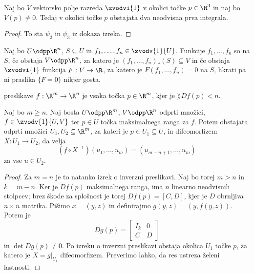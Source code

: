 \begin{posledica}
  Naj bo $V$ vektorsko polje razreda $\zvodvi{1}$ v okolici točke $p \in \R^3$
  in naj bo $V(p) \ne 0$.
  Tedaj v okolici točke $p$ obstajata dva neodvisna prva integrala.
\end{posledica}

\begin{proof}
  To sta $\psi_2$ in $\psi_3$ iz dokaza izreka.
\end{proof}



\begin{definicija}
  Naj bo $U \odpp \R^n$, $S \subseteq U$ in $f_1, \ldots, f_n \in \zvodv{1}{U}$.
  Funkcije $f_1, \ldots, f_n$ so  na $S$, če obstaja
  $V\odpp\R^n$, za katero je $(f_1, \ldots, f_n)_*(S) \subseteq V$ in če obstaja
  $\zvodvi{1}$ funkcija $F: V \to \R$, za katero je $F(f_1, \ldots, f_n) = 0$ na
  $S$, hkrati pa ni praslika $\{F = 0\}$ nikjer gosta.
\end{definicija}


\begin{definicija}
   preslikave $f: \R^m \to \R^n$ je vsaka točka $p \in
  \R^m$, kjer je $\rang Df(p) < n$.
\end{definicija}

\begin{izrek}
  Naj bo $m \ge n$.
  Naj bosta $U \odpp\R^m$, $V \odpp\R^n$ odprti množici, $f \in \zvodv{1}{U,V}$
  ter $p \in U$ točka maksimalnega ranga za $f$.
  Potem obstajata odprti množici $U_1, U_2 \subseteq \R^m$, za kateri je $p \in
  U_1 \subseteq U$, in difeomorfizem $X: U_1 \to U_2$, da velja
  \[
	(f \circ X^{-1})(u_1, \ldots, u_m) = (u_{m-n+1}, \ldots, u_m)
  \]
  za vse $u \in U_2$.
\end{izrek}

\begin{proof}
  Za $m = n$ je to natanko izrek o inverzni preslikavi.
  Naj bo torej $m > n$ in $k = m-n$.
  Ker je $Df(p)$ maksimalnega ranga, ima $n$ linearno neodvisnih stolpcev;
  brez škode za splošnost je torej $Df(p) = [C, D]$, kjer je $D$ obrnljiva $n
  \times n$ matrika.
  Pišimo $x = (y, z)$ in definirajmo $g(y,z) = (y, f(y, z))$.
  Potem je
  \[
	Dg(p) =
	\begin{bmatrix}
	  I_k & 0 \\
	  C & D
	\end{bmatrix}
  \]
  in $\det Dg(p) \ne 0$.
  Po izreku o inverzni preslikavi obstaja okolica $U_1$ točke $p$, za katero je
  $X = \left. g \right|_{U_1}$ difeomorfizem.
  Preverimo lahko, da res ustreza želeni lastnosti.
\end{proof}

